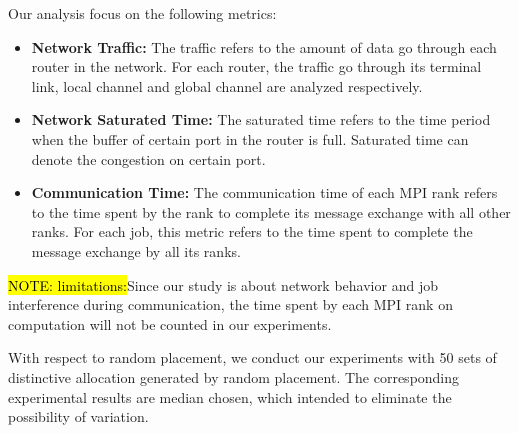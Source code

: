 \documentclass[conference,compsoc]{IEEEtran}
\newcommand{\NOTE}[1]{\hl {NOTE: #1}}
\begin{document}
Our analysis focus on the following metrics:
\begin{itemize}

    \item \textbf{Network Traffic:} The traffic refers to the amount of data go through each router in the network. For each router, the traffic go through its terminal link, local channel and global channel are analyzed respectively.
    
    \item \textbf{Network Saturated Time:} The saturated time refers to the time period when  the buffer of certain port in the router is full. Saturated time can denote the congestion on certain port.
    
    \item \textbf{Communication Time:} The communication time of each MPI rank refers to the time spent by the rank to complete its message exchange with all other ranks. For each job, this metric refers to the time spent to complete the message exchange by all its ranks.

\end{itemize}

\NOTE{limitations:}Since our study is about network behavior and job interference during communication, the time spent by each MPI rank on computation will not be counted in our experiments. 

With respect to random placement, we conduct our experiments with 50 sets of distinctive allocation generated by random placement. The corresponding experimental results are median chosen, which intended to eliminate the possibility of variation.



%
\end{document}
